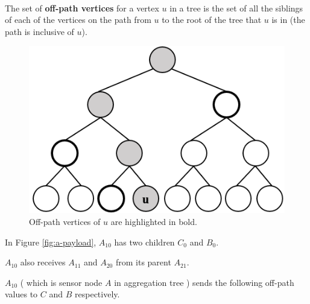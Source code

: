 \documentclass[%
  slidesonly,%
  semlayer%
  ]{seminar}                                  %
\newenvironment{defn}{\noindent \\ \noindent{\bf Defn:}}{\hspace*{\fill} \newline}
\newcommand{\sk}{\sf{sk}}
\begin{document}
\begin{slide}
        \begin{defn}
          The set of \textbf{off-path vertices} for a vertex $u$ in a tree is the set of all the siblings of each of the vertices on the path from $u$ to the root of the tree that $u$ is in (the path is inclusive of $u$).
        \end{defn}
        \begin{figure}[h!]
          \centering
          \includegraphics[scale = 0.4]{images/off-path.png}
          \caption{Off-path vertices of $u$ are highlighted in bold.}
          \label{fig:commitment-tree-example-2-shia}
        \end{figure}
        \vfill
        \clearpage

        In Figure \ref{fig:a-payload}, $A_{10}$ has two children $C_{0}$ and $B_{0}$.
        
        $A_{10}$ also receives $A_{11}$ and $A_{20}$ from its parent $A_{21}$.
        
        $A_{10}$ ( which is sensor node $A$ in aggregation tree ) sends the following off-path values to $C$ and $B$ respectively.
        
        
        

\end{slide}
\end{document}
